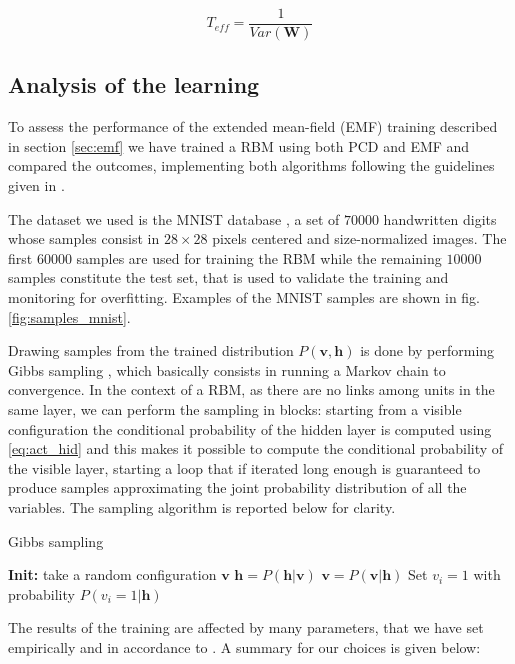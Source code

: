 \documentclass{revtex4-1}
\begin{document}
\begin{equation}
T_{eff} = \frac{1}{Var(\mathbf{W})}
\label{eq:t_eff}
\end{equation}

\subsection{Analysis of the learning}
To assess the performance of the extended mean-field (EMF) training described in section \ref{sec:emf} we have trained a RBM using both PCD and EMF and compared the outcomes, implementing both algorithms following the guidelines given in \cite{Hinton_guide}.

The dataset we used is the MNIST database \cite{mnist}, a set of \(70000\) handwritten digits whose samples consist in \(28 \times 28\) pixels centered and size-normalized images. The first \(60000\) samples are used for training the RBM while the remaining \(10000\) samples constitute the test set, that is used to validate the training and monitoring for overfitting. Examples of the MNIST samples are shown in fig. \ref{fig:samples_mnist}.

Drawing samples from the trained distribution \(P(\mathbf{v},\mathbf{h})\) is done by performing Gibbs sampling \cite{gibbs}, which basically consists in running a Markov chain to convergence. In the context of a RBM, as there are no links among units in the same layer, we can perform the sampling in blocks: starting from a visible configuration the conditional probability of the hidden layer is computed using \eqref{eq:act_hid} and this makes it possible to compute the conditional probability of the visible layer, starting a loop that if iterated long enough is guaranteed to produce samples approximating the joint probability distribution of all the variables. The sampling algorithm is reported below for clarity.

\begin{algorithm}[H]
\caption{Gibbs sampling}\label{alg:gibbs}
\begin{algorithmic}[1]
\State \textbf{Init:} take a random configuration \(\mathbf{v}\)
  \State \( \mathbf{h} = P(\mathbf{h}|\mathbf{v}) \)
  \State \( \mathbf{v} = P(\mathbf{v}|\mathbf{h}) \)
\EndFor
\State Set \(v_i = 1\) with probability \(P(v_i = 1|\mathbf{h})\)
\end{algorithmic}
\end{algorithm}

The results of the training are affected by many parameters, that we have set empirically and in accordance to \cite{PCD}\cite{tap_train}. A summary for our choices is given below:
\end{document}
